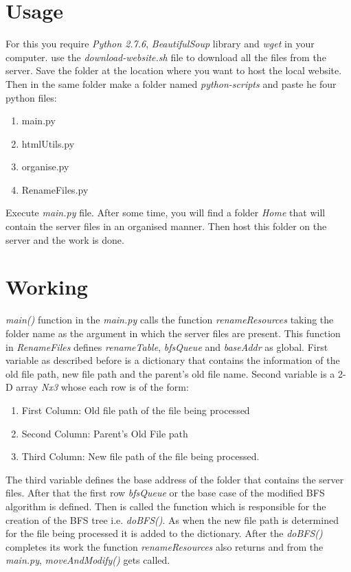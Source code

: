 \documentclass[11pt]{article}
\begin{document}
\section{Usage}
For this you require \textit{Python 2.7.6}, \textit{BeautifulSoup} library and \textit{wget} in your computer. use the \textit{download-website.sh} file to download all the files from the server. Save the folder at the location where you want to host the local website. Then in the same folder make a folder named \textit{python-scripts} and paste he four python files: 
\begin{enumerate}
\item main.py
\item htmlUtils.py
\item organise.py
\item RenameFiles.py
\end{enumerate}
Execute \textit{main.py} file. After some time, you will find a folder \textit{Home} that will contain the server files in an organised manner. Then host this folder on the server and the work is done. 

\newpage
\section{Working}
\textit{main()} function in the \textit{main.py} calls the function \textit{renameResources} taking the folder name as the argument in which the server files are present. This function in \textit{RenameFiles} defines \textit{renameTable}, \textit{bfsQueue} and \textit{baseAddr} as global. First variable as described before is a dictionary that contains the information of the old file path, new file path and the parent's old file name. Second variable is a 2-D array \textit{Nx3} whose each row is of the form:
\begin{enumerate}
\item First Column: Old file path of the file being processed 
\item Second Column: Parent's Old File path
\item Third Column: New file path of the file being processed.
\end{enumerate}
The third variable defines the base address of the folder that contains the server files. 
After that the first row \textit{bfsQueue} or the base case of the modified BFS algorithm is defined.
Then is called the function which is responsible for the creation of the BFS tree i.e. \textit{doBFS()}.
As when the new file path is determined for the file being processed it is added to the dictionary.
After the \textit{doBFS()} completes its work the function \textit{renameResources} also returns and from the \textit{main.py}, \textit{moveAndModify()} gets called.
\end{document}
